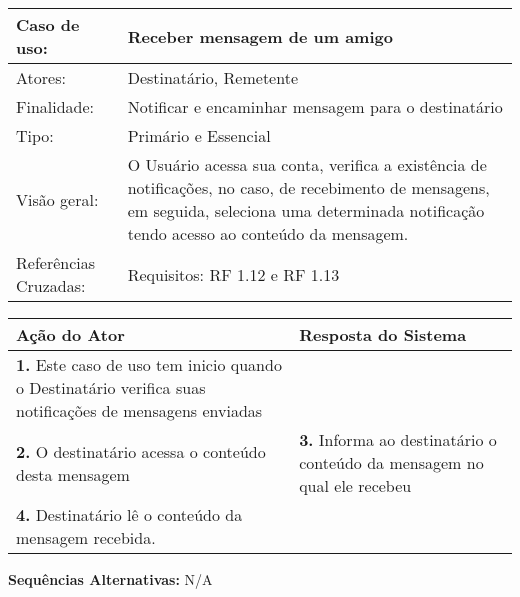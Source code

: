 \documentclass[12pt,a4paper,onecolumn,titlepage]{article}
\begin{document}
\begin{table}[h!]
\begin{center}
\begin{tabular}{p{2.5cm} p{9.5cm}}
Caso de uso: & \textbf{Receber mensagem de um amigo} \\ \hline
Atores: & Destinatário, Remetente \\ \hline
Finalidade: & Notificar e encaminhar mensagem para o destinatário\\ \hline
Tipo: & Primário e Essencial \\ \hline
Visão geral: & O Usuário acessa sua conta, verifica a existência de notificações, no caso, de recebimento de mensagens, em seguida, seleciona uma determinada notificação tendo acesso ao conteúdo da mensagem. \\ \hline
Referências Cruzadas: & Requisitos: RF 1.12 e RF 1.13\\

\end{tabular}
\end{center}
\end{table} 

\begin{center}
\def\arraystretch{1.1}
\begin{tabular}{|p{6cm}|p{6cm}|}

\hline
\textbf{Ação do Ator} & \textbf{Resposta do Sistema} \\ \hline
\textbf{1.} Este caso de uso tem inicio quando o Destinatário verifica suas notificações de mensagens enviadas  &  \\ \hline
\textbf{2.} O destinatário acessa o conteúdo desta mensagem  & 
\textbf{3.} Informa ao destinatário o conteúdo da mensagem no qual ele recebeu \\ \hline
\textbf{4.} Destinatário lê o conteúdo da mensagem recebida. & \\ \hline
\end{tabular}
\end{center}

\textbf{Sequências Alternativas:} N/A

\newpage
\end{document}

